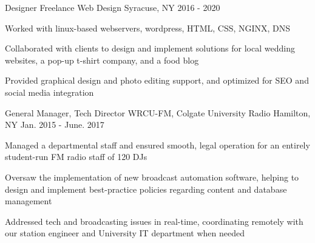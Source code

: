 \begin{cventries}

\cventry
{Designer} %
{Freelance Web Design} %
{Syracuse, NY} %
{2016 - 2020} %
{ %
\begin{cvitems}
\item {Worked with linux-based webservers, wordpress, HTML, CSS, NGINX, DNS}
\item {Collaborated with clients to design and implement solutions for local wedding websites, a pop-up t-shirt company, and a food blog}
\item {Provided graphical design and photo editing support, and optimized for SEO and social media integration}
\end{cvitems}
}


\cventry
{General Manager, Tech Director} %
{WRCU-FM, Colgate University Radio} %
{Hamilton, NY} %
{Jan. 2015 - June. 2017} %
{ %
\begin{cvitems}
\item {Managed a departmental staff and ensured smooth, legal operation for an entirely student-run FM radio staff of 120 DJs}
\item {Oversaw the implementation of new broadcast automation software, helping to design and implement best-practice policies regarding content and database management}
\item {Addressed tech and broadcasting issues in real-time, coordinating remotely with our station engineer and University IT department when needed}
\end{cvitems}
}


\end{cventries}

